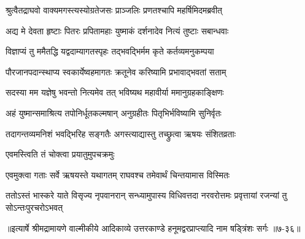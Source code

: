\twolineshloka
{श्रुत्वैतद्राघवो वाक्यमगस्त्यस्योग्रतेजसः}
{प्राञ्जलिः प्रणतश्चापि महर्षिमिदमब्रवीत्} %

\twolineshloka
{अद्य मे देवता हृष्टाः पितरः प्रपितामहाः}
{युष्माकं दर्शनादेव नित्यं तुष्टाः सबान्धवाः} %

\twolineshloka
{विज्ञाप्यं तु ममैतद्धि यद्वदाम्यागतस्पृहः}
{तद्भवद्भिर्मम कृते कर्तव्यमनुकम्पया} %

\twolineshloka
{पौरजानपदान्स्थाप्य स्वकार्येष्वहमागतः}
{क्रतूनेव करिष्यामि प्रभावाद्भवतां सताम्} %

\twolineshloka
{सदस्या मम यज्ञेषु भवन्तो नित्यमेव तत्}
{भविष्यथ महावीर्या ममानुग्रहकाङ्क्षिणः} %

\twolineshloka
{अहं युष्मान्समाश्रित्य तपोनिर्धूतकल्मषान्}
{अनुग्रहीतः पितृभिर्भविष्यामि सुनिर्वृतः} %

\twolineshloka
{तदागन्तव्यमनिशं भवद्भिरिह सङ्गतैः}
{अगस्त्याद्यास्तु तच्छ्रुत्वा ऋषयः संशितव्रताः} %

\onelineshloka
{एवमस्त्विति तं चोक्त्वा प्रयातुमुपचक्रमुः} %

\twolineshloka
{एवमुक्त्वा गताः सर्वे ऋषयस्ते यथागतम्}
{राघवश्च तमेवार्थं चिन्तयामास विस्मितः} %

\threelineshloka
{ततोऽस्तं भास्करे याते विसृज्य नृपवानरान्}
{सन्ध्यामुपास्य विधिवत्तदा नरवरोत्तमः}
{प्रवृत्तायां रजन्यां तु सोऽन्तःपुरचरोऽभवत्} %


॥इत्यार्षे श्रीमद्रामायणे वाल्मीकीये आदिकाव्ये उत्तरकाण्डे हनूमद्वरप्राप्त्यादि नाम षड्त्रिंशः सर्गः ॥७-३६॥
